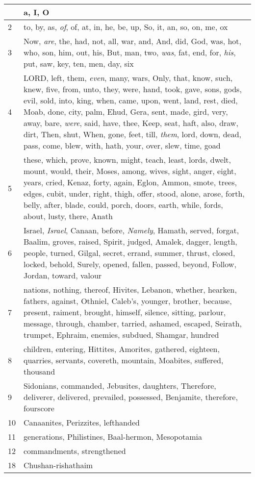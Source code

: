 \begin{longtable}{l|p{3.75in}}
\hline \hline
\endlastfoot
1 & a, I, O \\ \hline
2 & to, by, as, \emph{of}, of, at, in, he, be, up, So, it, an, so, on, me, ox \\ \hline
3 & Now, \emph{are}, the, had, not, all, war, and, And, did, God, was, hot, who, son, him, out, his, But, man, two, \emph{was}, fat, end, for, \emph{his}, put, saw, key, ten, men, day, six \\ \hline
4 & LORD, left, them, \emph{even}, many, wars, Only, that, know, such, knew, five, from, unto, they, were, hand, took, gave, sons, gods, evil, sold, into, king, when, came, upon, went, land, rest, died, Moab, done, city, palm, Ehud, Gera, sent, made, gird, very, away, bare, \emph{were}, said, have, thee, Keep, seat, haft, also, draw, dirt, Then, shut, When, gone, feet, till, \emph{them}, lord, down, dead, pass, come, blew, with, hath, your, over, slew, time, goad \\ \hline
5 & these, which, prove, known, might, teach, least, lords, dwelt, mount, would, their, Moses, among, wives, sight, anger, eight, years, cried, Kenaz, forty, again, Eglon, Ammon, smote, trees, edges, cubit, under, right, thigh, offer, stood, alone, arose, forth, belly, after, blade, could, porch, doors, earth, while, fords, about, lusty, there, Anath \\ \hline
6 & Israel, \emph{Israel}, Canaan, before, \emph{Namely}, Hamath, served, forgat, Baalim, groves, raised, Spirit, judged, Amalek, dagger, length, people, turned, Gilgal, secret, errand, summer, thrust, closed, locked, behold, Surely, opened, fallen, passed, beyond, Follow, Jordan, toward, valour \\ \hline
7 & nations, nothing, thereof, Hivites, Lebanon, whether, hearken, fathers, against, Othniel, Caleb's, younger, brother, because, present, raiment, brought, himself, silence, sitting, parlour, message, through, chamber, tarried, ashamed, escaped, Seirath, trumpet, Ephraim, enemies, subdued, Shamgar, hundred \\ \hline
8 & children, entering, Hittites, Amorites, gathered, eighteen, quarries, servants, covereth, mountain, Moabites, suffered, thousand \\ \hline
9 & Sidonians, commanded, Jebusites, daughters, Therefore, deliverer, delivered, prevailed, possessed, Benjamite, therefore, fourscore \\ \hline
10 & Canaanites, Perizzites, lefthanded \\ \hline
11 & generations, Philistines, Baal-hermon, Mesopotamia \\ \hline
12 & commandments, strengthened \\ \hline
18 & Chushan-rishathaim \\ \hline
\end{longtable}






